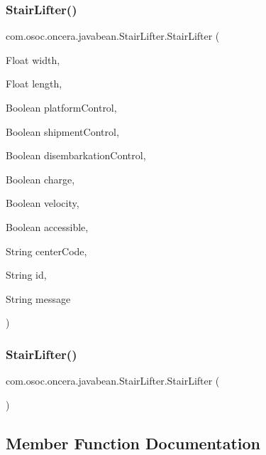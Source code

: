 \subsubsection{\texorpdfstring{StairLifter()}{StairLifter()}\hspace{0.1cm}{\footnotesize\ttfamily [1/2]}}
{\footnotesize\ttfamily com.\+osoc.\+oncera.\+javabean.\+Stair\+Lifter.\+Stair\+Lifter (\begin{DoxyParamCaption}\item[{Float}]{width,  }\item[{Float}]{length,  }\item[{Boolean}]{platform\+Control,  }\item[{Boolean}]{shipment\+Control,  }\item[{Boolean}]{disembarkation\+Control,  }\item[{Boolean}]{charge,  }\item[{Boolean}]{velocity,  }\item[{Boolean}]{accessible,  }\item[{String}]{center\+Code,  }\item[{String}]{id,  }\item[{String}]{message }\end{DoxyParamCaption})}

\mbox{\label{classcom_1_1osoc_1_1oncera_1_1javabean_1_1_stair_lifter_a426e3ff49821574bf7907fbcd65bc95d}} 
\subsubsection{\texorpdfstring{StairLifter()}{StairLifter()}\hspace{0.1cm}{\footnotesize\ttfamily [2/2]}}
{\footnotesize\ttfamily com.\+osoc.\+oncera.\+javabean.\+Stair\+Lifter.\+Stair\+Lifter (\begin{DoxyParamCaption}{ }\end{DoxyParamCaption})}



\subsection{Member Function Documentation}
\mbox{\label{classcom_1_1osoc_1_1oncera_1_1javabean_1_1_stair_lifter_a31bbcbe4ee4cf1db8e41c4135d2734e9}} 
